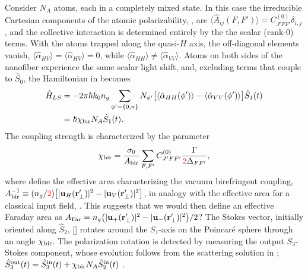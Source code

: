 \documentclass[preprint,aps,pra,onecolumn]{revtex4-1} %
\newcommand{\chibir}{\chi_{\rm bir}}
\newcommand{\Abiref}{A_{\rm bir}}
\newcommand{\change}[1]{{\color{RoyalBlue} #1}}
\newcommand{\comment}[1]{{\color{Maroon} #1}}
\newcommand{\error}[1]{{\color{red} #1}}
\begin{document}
Consider $N_A$ atoms, each in a completely mixed state. In this case the irreducible Cartesian components of the atomic polarizability, , are $\langle \hat{A}_{ij}(F,F') \rangle = C_{J'FF'}^{(0)} \delta_{i,j}$, and the collective interaction is determined entirely by the the scalar (rank-0) terms.  With the atoms trapped along the quasi-$H$ axis, the off-diagonal elements vanish, $\langle \hat{\alpha}_{HV} \rangle = \langle \hat{\alpha}_{HV} \rangle =0$, while $\langle \hat{\alpha}_{HH} \rangle \neq  \langle \hat{\alpha}_{VV} \rangle$.  Atoms on both sides of the nanofiber experience the same scalar light shift, and, excluding terms that couple to $\hat{S}_0$, the Hamiltonian in  becomes
	\begin{align}
		\hat{H}_{LS} &= -2\pi \hbar k_0 n_g \sum_{\phi' = \{0,\pi \}} N_{\phi'} \big[ \expt{\hat{\alpha}_{HH}(\phi')}  - \expt{\hat{\alpha}_{VV}(\phi')} \big] \hat{S}_1(t)  \\
		& =  \hbar \chibir N_A \hat{S}_1(t).  \label{Eq::MixedHamiltonian}
	\end{align}
The coupling strength is characterized by the parameter 	
	\begin{equation} \label{Eq::RotationAngle}
		\chibir = \frac{\sigma_0}{\Abiref}  \sum_{F,F'}  C_{J'FF'}^{(0)} \frac{\Gamma}{\error{2} \Delta_{FF'}},
	\end{equation}
where define the effective area characterizing the \change{vacuum} birefringent coupling, $\Abiref^{-1} \equiv (n_g/\error{2}) \big[ |\mathbf{u}_{H}(\br'_\perp)|^2 - |\mathbf{u}_{V}(\br'_\perp)| ^2 \big]$, in analogy with the effective area for a classical input field, .   \comment{This suggests that we would then define an effective Faraday area as $A_{\rm Far} = n_g\big( |\mathbf{u}_{+}(\mathbf{r}'_\perp)|^2 - |\mathbf{u}_{-}(\mathbf{r}'_\perp)| ^2 \big)/2$?} The Stokes vector, initially oriented along $\hat{S}_2$, [] rotates around the $S_1$-axis on the Poincar\'{e} sphere through an angle $\chibir$. The polarization rotation is detected by measuring the output $S_3$-Stokes component, whose evolution follows from the scattering solution in ; $\hat{S}_3^{\rm out}(t) = \hat{S}_3^{\rm in}(t) + \chibir N_A \hat{S}_2^{\rm in}(t)$ \cite{hammerer_quantum_2010}.
\end{document}
